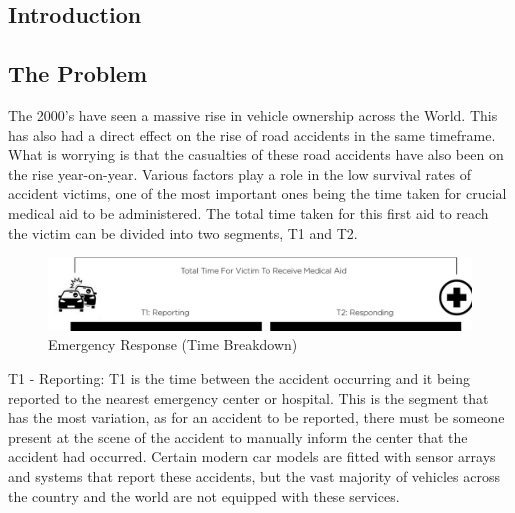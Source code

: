 \documentclass[ 12pt,a4paper,twocolumn,fleqn]{article}
\begin{document}
\chead{}
\onecolumn


\newpage
  \pagestyle{fancy}
\tableofcontents

\newpage
  \pagestyle{fancy}
\listoffigures

\newpage
  \pagestyle{fancy}
\begin{adjustwidth}{3.5em}{0pt}
\setcounter{page}{1}
\section{Introduction}
\subsection{The Problem}

The 2000’s have seen a massive rise in vehicle ownership across the World. This has also had a direct effect on the rise of road accidents in the same timeframe. What is worrying is that the casualties of these road accidents have also been on the rise year-on-year. Various factors play a role in the low survival rates of accident victims, one of the most important ones being the time taken for crucial medical aid to be administered. The total time taken for this first aid to reach the victim can be divided into two segments, T1 and T2.

\begin{figure}[h]
    \centering
    \hspace*{0.4in}
    \includegraphics[scale=0.4]{media/t1.png}
    \caption{Emergency Response (Time Breakdown)}
    \label{fig:my_label}
\end{figure}

T1 - Reporting:
T1 is the time between the accident occurring and it being reported to the nearest emergency center or hospital. This is the segment that has the most variation, as for an accident to be reported, there must be someone present at the scene of the accident to manually inform the center that the accident had occurred. Certain modern car models are fitted with sensor arrays and systems that report these accidents, but the vast majority of vehicles across the country and the world are not equipped with these services. 


\end{adjustwidth}
\end{document}
